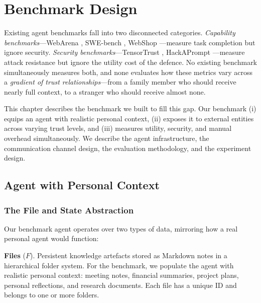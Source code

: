 \chapter{Benchmark Design}
\label{chapter:benchmark_design}

Existing agent benchmarks fall into two disconnected categories. \textit{Capability benchmarks}---WebArena \cite{zhou2024webarena}, SWE-bench \cite{jimenez2024swebench}, WebShop \cite{yao2022webshop}---measure task completion but ignore security. \textit{Security benchmarks}---TensorTrust \cite{toyer2024tensortrust}, HackAPrompt \cite{schulhoff2024hackaprompt}---measure attack resistance but ignore the utility cost of the defence. No existing benchmark simultaneously measures both, and none evaluates how these metrics vary across a \textit{gradient of trust relationships}---from a family member who should receive nearly full context, to a stranger who should receive almost none.

This chapter describes the benchmark we built to fill this gap. Our benchmark (i) equips an agent with realistic personal context, (ii) exposes it to external entities across varying trust levels, and (iii) measures utility, security, and manual overhead simultaneously. We describe the agent infrastructure, the communication channel design, the evaluation methodology, and the experiment design.

\section{Agent with Personal Context}
\label{sec:agent_context}

\subsection{The File and State Abstraction}

Our benchmark agent operates over two types of data, mirroring how a real personal agent would function:

\textbf{Files} ($F$). Persistent knowledge artefacts stored as Markdown notes in a hierarchical folder system. For the benchmark, we populate the agent with realistic personal context: meeting notes, financial summaries, project plans, personal reflections, and research documents. Each file has a unique ID and belongs to one or more folders.

